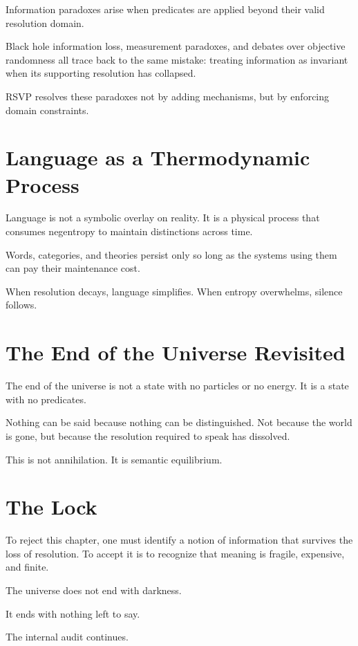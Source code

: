 \documentclass[11pt]{book}
\begin{document}
Information paradoxes arise when predicates are applied beyond their valid resolution domain.

Black hole information loss, measurement paradoxes, and debates over objective randomness all trace back to the same mistake: treating information as invariant when its supporting resolution has collapsed.

RSVP resolves these paradoxes not by adding mechanisms, but by enforcing domain constraints.

\section{Language as a Thermodynamic Process}

Language is not a symbolic overlay on reality. It is a physical process that consumes negentropy to maintain distinctions across time.

Words, categories, and theories persist only so long as the systems using them can pay their maintenance cost.

When resolution decays, language simplifies. When entropy overwhelms, silence follows.

\section{The End of the Universe Revisited}

The end of the universe is not a state with no particles or no energy. It is a state with no predicates.

Nothing can be said because nothing can be distinguished. Not because the world is gone, but because the resolution required to speak has dissolved.

This is not annihilation. It is semantic equilibrium.

\section{The Lock}

To reject this chapter, one must identify a notion of information that survives the loss of resolution. To accept it is to recognize that meaning is fragile, expensive, and finite.

The universe does not end with darkness.

It ends with nothing left to say.

The internal audit continues.

\end{document}
